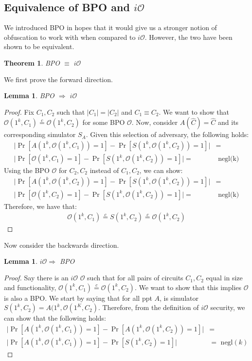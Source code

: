 \documentclass{article}
\newtheorem{theorem}{Theorem}%
\newtheorem{lemma}[corollary]{Lemma}
\newcommand{\ci}{\stackrel{c}{=}}
\newcommand{\io}{i\mathcal{O}}
\begin{document}
\subsection{Equivalence of BPO and $\io$}
We introduced BPO in hopes that it would give us a stronger notion of obfuscation to work with when compared to $\io$. However, the two have been shown to be equivalent.
\begin{theorem}
BPO $\equiv$ $\io$
\end{theorem}
\noindent We first prove the forward direction.
\begin{lemma}
BPO $\Rightarrow$ $\io$
\end{lemma}
\begin{proof}
    Fix $C_1, C_2$ such that $\lvert C_1 \rvert = \lvert C_2 \rvert$ and $C_1 \equiv C_2$. We want to show that $\mathcal{O}(1^k, C_1) \ci \mathcal{O}(1^k, C_2)$ for some BPO $\mathcal{O}$. Now, consider $A(\hat C) = \hat C$ and its corresponding simulator $S_A$. Given this selection of adversary, the following holds:
        \begin{align*}
            \biggr\lvert \Pr[A(1^k, \mathcal{O}(1^k, C_1)) = 1] - \Pr[S(1^k, \mathcal{O}(1^k, C_2)) = 1] \biggr\rvert &= \\
            \biggr\lvert \Pr[\mathcal{O}(1^k, C_1) = 1] - \Pr[S(1^k, \mathcal{O}(1^k, C_2)) = 1] \biggr\rvert = &\text{ negl(k)}
        \end{align*}
    Using the BPO $\mathcal{O}$ for $C_2, C_2$ instead of $C_1, C_2$, we can show:
        \begin{align*}
            \biggr\lvert \Pr[A(1^k, \mathcal{O}(1^k, C_2)) = 1] - \Pr[S(1^k, \mathcal{O}(1^k, C_2)) = 1] \biggr\rvert &= \\
            \biggr\lvert \Pr[\mathcal{O}(1^k, C_2) = 1] - \Pr[S(1^k, \mathcal{O}(1^k, C_2)) = 1] \biggr\rvert = &\text{ negl(k)}
        \end{align*}
    Therefore, we have that:
        \begin{align*}
            \mathcal{O}(1^k, C_1) \ci S(1^k, C_2) \ci \mathcal{O}(1^k, C_2)
        \end{align*}
\end{proof}
\noindent Now consider the backwards direction.
\begin{lemma}
$\io \Rightarrow$ BPO
\end{lemma}
\begin{proof}
    Say there is an $\io$ $\mathcal{O}$ such that for all pairs of circuits $C_1, C_2$ equal in size and functionality, $\mathcal{O}(1^k, C_1) \ci \mathcal{O}(1^k, C_2)$. We want to show that this implies $\mathcal{O}$ is also a BPO. We start by saying that for all ppt $A$, is simulator $S(1^k, C_2) = A(1^k, \mathcal{O}(1^K, C_2)$. Therefore, from the definition of $\io$ security, we can show that the following holds:
        \begin{align*}
            \biggr\lvert \Pr[A(1^k, \mathcal{O}(1^k, C_1)) = 1] - \Pr[A(1^k, \mathcal{O}(1^k, C_2)) = 1] \biggr\rvert &=  \\
            \biggr\lvert \Pr[A(1^k, \mathcal{O}(1^k, C_1)) = 1] - \Pr[S(1^k, C_2) = 1] \biggr\rvert &= \text{ negl$(k)$}
        \end{align*}
\end{proof}
\end{document}
